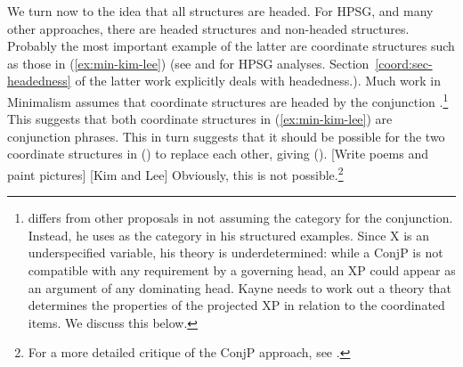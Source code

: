 \documentclass[output=paper,biblatex,babelshorthands,newtxmath,draftmode,colorlinks,citecolor=brown]{langscibook}
\begin{document}
We turn now to the idea that all structures are headed. For HPSG, and many other approaches, there
are headed structures and non-headed structures. Probably the most important example of the latter
are coordinate structures such as those in (\ref{ex:min-kim-lee}) (see \citealt{Sag2003a-u} and
 for HPSG analyses. Section~\ref{coord:sec-headedness} of
the latter work explicitly deals with headedness.).
\label{ex:min-kim-lee}
\z
Much work in Minimalism assumes that coordinate structures are headed by the conjunction
\parencites[]{Larson90a-u}[]{Radford93a-u}[Chapter~6]{Kayne94a-u}[]{Johannessen98a-u}[]{vanKoppen2005a-u}[]{Boskovic2009a-u}[]{Citko2011a-u}.\footnote{
  \citet[]{Kayne94a-u} differs from other proposals in not assuming the category for
  the conjunction. Instead, he uses \xnull as the category in his structured examples. Since X is an
  underspecified variable, his theory is underdetermined: while a ConjP is not compatible with any
  requirement by a governing head, an XP could appear as an argument of any dominating head. Kayne
  needs to work out a theory that determines the properties of the projected XP in relation to
  the coordinated items. We discuss this below.
}
This suggests that both coordinate structures in (\ref{ex:min-kim-lee}) are conjunction phrases. 
This in turn suggests that it should be possible for the two coordinate structures in () to replace each other, giving ().
\ea
{}[Write poems and paint pictures] [Kim and Lee]
\z
Obviously, this is not possible.\footnote{%
For a more detailed critique of the ConjP approach, see \citet{Borsley2005a}.%
}
\end{document}

